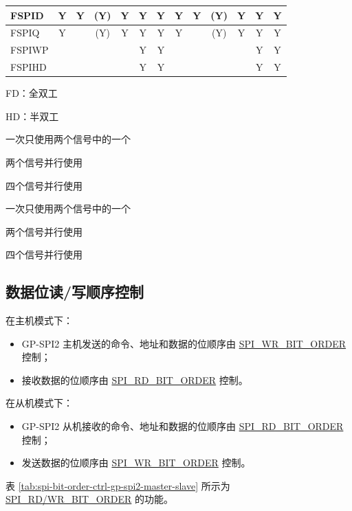 \documentclass[main\_\_CN.tex]{subfiles}
\begin{document}
\begin{landscape}
\begin{table}[H]
\begin{threeparttable}
\begin{tabular}{ |p{2.0cm} |c|c|c|c|c|c|c|c|c|c|c|c| }
FSPID                    & Y       & Y       & (Y)\tnote{3}      & Y\tnote{4}      & Y\tnote{5}      & Y      & Y       & Y      & (Y)\tnote{6}      & Y\tnote{7}     & Y\tnote{8}     & Y      \\ \hline
FSPIQ                    & Y       &         & (Y)\tnote{3}      & Y\tnote{4}      & Y\tnote{5}      & Y      & Y       &        & (Y)\tnote{6}     & Y\tnote{7}     & Y\tnote{8}      & Y      \\ \hline
FSPIWP                   &         &         &         &         & Y\tnote{5}      & Y      &         &        &         &         & Y\tnote{8}       & Y      \\ \hline
FSPIHD                   &         &         &         &         & Y\tnote{5}      & Y      &         &        &         &         & Y\tnote{8}       & Y      \\ \hline
\end{tabular}

        \begin{tablenotes}
            \item[1] FD：全双工
            \item[2] HD：半双工
            \item[3] 一次只使用两个信号中的一个
            \item[4] 两个信号并行使用
            \item[5] 四个信号并行使用
            \item[6] 一次只使用两个信号中的一个
            \item[7] 两个信号并行使用
            \item[8] 四个信号并行使用
        \end{tablenotes}
     \end{threeparttable}
    \end{table}
\end{landscape}

\subsection{数据位读/写顺序控制}
在主机模式下：
\begin{itemize}
    \item GP-SPI2 主机发送的命令、地址和数据的位顺序由 \hyperref[fielddesc:SPIWRBITORDER]{SPI\_WR\_BIT\_ORDER} 控制；
    \item 接收数据的位顺序由 \hyperref[fielddesc:SPIRDBITORDER]{SPI\_RD\_BIT\_ORDER} 控制。
\end{itemize}
在从机模式下：
\begin{itemize}
    \item GP-SPI2 从机接收的命令、地址和数据的位顺序由 \hyperref[fielddesc:SPIRDBITORDER]{SPI\_RD\_BIT\_ORDER} 控制；
    \item 发送数据的位顺序由 \hyperref[fielddesc:SPIWRBITORDER]{SPI\_WR\_BIT\_ORDER} 控制。
\end{itemize}
表 \ref{tab:spi-bit-order-ctrl-gp-spi2-master-slave} 所示为 \hyperref[fielddesc:SPIRDBITORDER]{SPI\_RD/WR\_BIT\_ORDER} 的功能。
\end{document}
